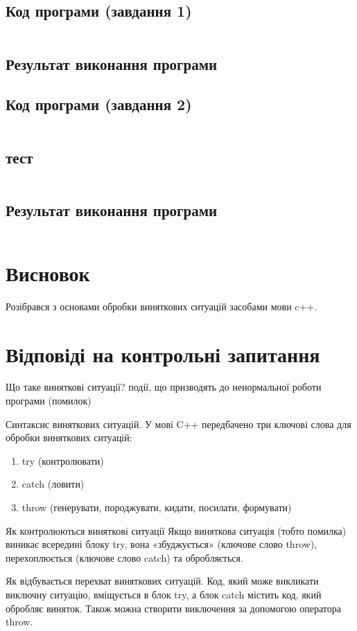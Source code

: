 \documentclass[a4paper, 12pt, oneside]{extarticle}
\begin{document}
\subsection*{Код програми (завдання 1)}
\inputminted{c++}{task_1/task1.cpp}
\subsection*{Результат виконання програми}


\subsection*{Код програми (завдання 2)}
\inputminted{c++}{task_2/avg.cpp}
\subsection*{тест}
\inputminted{sh}{task_2/test}
\subsection*{Результат виконання програми}
\inputminted{sh}{task_2/out}

\section*{Висновок}

Розібрався з основами обробки виняткових ситуацій засобами
мови c++.

\section*{Відповіді на контрольні запитання}
\begin{itemize}
	\question Що таке виняткові ситуації?
	\answer події, що призводять до ненормальної роботи програми (помилок)

	\question Синтаксис виняткових ситуацій.
	\answer У мові C++ передбачено три ключові слова для обробки виняткових ситуацій:
		\begin{enumerate}
		\item try (контролювати)
		\item catch (ловити)
		\item throw (генерувати, породжувати, кидати, посилати, формувати)
		\end{enumerate}

	\question Як контролюються виняткові ситуації
	\answer Якщо виняткова ситуація (тобто помилка)
виникає всередині блоку try, вона «збуджується» (ключове
слово throw), перехоплюється (ключове слово catch) та обробляється.


	\question Як відбувається перехват виняткових ситуацій.
	\answer Код, який може викликати виключну ситуацію, вміщується в блок try, а блок catch містить код, який обробляє виняток. Також можна створити виключення за допомогою оператора throw.

\end{itemize}
\end{document}
